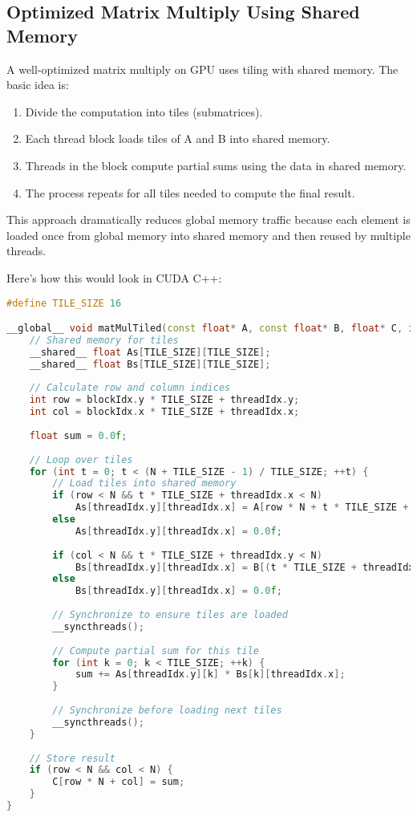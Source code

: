 \subsection{Optimized Matrix Multiply Using Shared Memory}

A well-optimized matrix multiply on GPU uses tiling with shared memory. The basic idea is:

\begin{enumerate}
    \item Divide the computation into tiles (submatrices).
    
    \item Each thread block loads tiles of A and B into shared memory.
    
    \item Threads in the block compute partial sums using the data in shared memory.
    
    \item The process repeats for all tiles needed to compute the final result.
\end{enumerate}

This approach dramatically reduces global memory traffic because each element is loaded once from global memory into shared memory and then reused by multiple threads.

Here's how this would look in CUDA C++:

\begin{lstlisting}[language=C++]
#define TILE_SIZE 16

__global__ void matMulTiled(const float* A, const float* B, float* C, int N) {
    // Shared memory for tiles
    __shared__ float As[TILE_SIZE][TILE_SIZE];
    __shared__ float Bs[TILE_SIZE][TILE_SIZE];
    
    // Calculate row and column indices
    int row = blockIdx.y * TILE_SIZE + threadIdx.y;
    int col = blockIdx.x * TILE_SIZE + threadIdx.x;
    
    float sum = 0.0f;
    
    // Loop over tiles
    for (int t = 0; t < (N + TILE_SIZE - 1) / TILE_SIZE; ++t) {
        // Load tiles into shared memory
        if (row < N && t * TILE_SIZE + threadIdx.x < N)
            As[threadIdx.y][threadIdx.x] = A[row * N + t * TILE_SIZE + threadIdx.x];
        else
            As[threadIdx.y][threadIdx.x] = 0.0f;
            
        if (col < N && t * TILE_SIZE + threadIdx.y < N)
            Bs[threadIdx.y][threadIdx.x] = B[(t * TILE_SIZE + threadIdx.y) * N + col];
        else
            Bs[threadIdx.y][threadIdx.x] = 0.0f;
        
        // Synchronize to ensure tiles are loaded
        __syncthreads();
        
        // Compute partial sum for this tile
        for (int k = 0; k < TILE_SIZE; ++k) {
            sum += As[threadIdx.y][k] * Bs[k][threadIdx.x];
        }
        
        // Synchronize before loading next tiles
        __syncthreads();
    }
    
    // Store result
    if (row < N && col < N) {
        C[row * N + col] = sum;
    }
}
\end{lstlisting}

